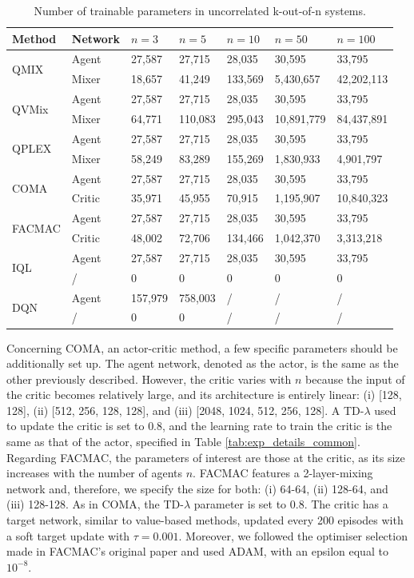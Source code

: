 \begin{table}
    \centering
    \setlength\tabcolsep{4.5pt}
    \begin{tabular}{lllllll}
    \toprule
    Method & Network & $n=3$ & $n=5$ & $n=10$ & $n=50$ & $n=100$ \\
    \midrule
    \multirow{2}{*}{QMIX} & Agent & 27,587 & 27,715 & 28,035 & 30,595 & 33,795 \\
 & Mixer & 18,657 & 41,249 & 133,569 & 5,430,657 & 42,202,113 \\
\multirow{2}{*}{QVMix} & Agent & 27,587 & 27,715 & 28,035 & 30,595 & 33,795 \\
 & Mixer & 64,771 & 110,083 & 295,043 & 10,891,779 & 84,437,891 \\
\multirow{2}{*}{QPLEX} & Agent & 27,587 & 27,715 & 28,035 & 30,595 & 33,795 \\
 & Mixer & 58,249 & 83,289 & 155,269 & 1,830,933 & 4,901,797 \\
\multirow{2}{*}{COMA} & Agent & 27,587 & 27,715 & 28,035 & 30,595 & 33,795 \\
 & Critic & 35,971 & 45,955 & 70,915 & 1,195,907 & 10,840,323 \\
\multirow{2}{*}{FACMAC} & Agent & 27,587 & 27,715 & 28,035 & 30,595 & 33,795 \\
 & Critic & 48,002 & 72,706 & 134,466 & 1,042,370 & 3,313,218 \\
\multirow{2}{*}{IQL} & Agent & 27,587 & 27,715 & 28,035 & 30,595 & 33,795 \\
 & / & 0 & 0 & 0 & 0 & 0 \\
\multirow{2}{*}{DQN} & Agent & 157,979 & 758,003 & / & / & / \\
 & / & 0 & 0 & / & / & / \\
    \bottomrule
    \end{tabular}
    \caption{Number of trainable parameters in uncorrelated k-out-of-n systems.}
    \label{tab:n_param_train}
\end{table}

Concerning COMA, an actor-critic method, a few specific parameters should be additionally set up.
The agent network, denoted as the actor, is the same as the other previously described.
However, the critic varies with $n$ because the input of the critic becomes relatively large, and its architecture is entirely linear: (i) [128, 128], (ii) [512, 256, 128, 128], and (iii) [2048, 1024, 512, 256, 128].
A TD-$\lambda$ used to update the critic is set to $0.8$, and the learning rate to train the critic is the same as that of the actor, specified in Table \ref{tab:exp_details_common}.
Regarding FACMAC, the parameters of interest are those at the critic, as its size increases with the number of agents $n$.
FACMAC features a 2-layer-mixing network and, therefore, we specify the size for both:
(i) 64-64, (ii) 128-64, and (iii) 128-128.
As in COMA, the TD-$\lambda$ parameter is set to $0.8$.
The critic has a target network, similar to value-based methods, updated every 200 episodes with a soft target update with $\tau=0.001$.
Moreover, we followed the optimiser selection made in FACMAC's original paper and used ADAM, with an epsilon equal to $10^{-8}$.

